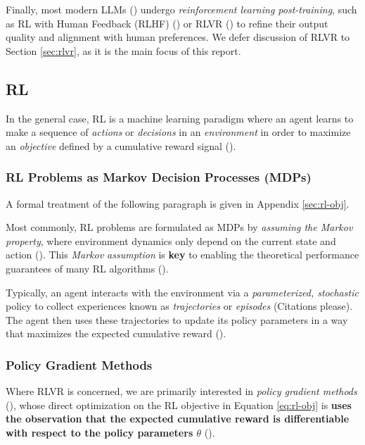 \documentclass{article} %
\theoremstyle{definition}
\begin{document}
Finally, most modern LLMs (\cite{tulu3, r1}) undergo \textit{reinforcement learning post-training},
such as RL with Human Feedback (RLHF) (\cite{Christiano-et-al-2017, InstructGPT-2022})
or RLVR (\cite{tulu3, grpo, r1}) to refine their output quality and alignment with human preferences.
We defer discussion of RLVR to Section \ref{sec:rlvr}, as it is the main focus of this report.

\subsection{RL}

In the general case, RL is a machine learning paradigm
where an agent learns to make a sequence of \textit{actions} or \textit{decisions} 
in an \textit{environment} in order to maximize an \textit{objective} defined by a cumulative reward signal (\cite{Sutton-and-Barto-1998}).

\subsubsection{RL Problems as Markov Decision Processes (MDPs)}
A formal treatment of the following paragraph is given in Appendix \ref{sec:rl-obj}.

Most commonly, RL problems are formulated as MDPs
by \textit{assuming the Markov property}, where environment dynamics
only depend on the current state and action
(\cite{SpinningUp-2018, Levine-et-al-2023, Sutton-and-Barto-1998}). This \textit{Markov assumption} is \textbf{key} to 
enabling the theoretical performance guarantees of many RL algorithms (\cite{Sutton-and-Barto-1998}).

Typically, an agent interacts with the environment via a \textit{parameterized, stochastic} policy
to collect experiences known as \textit{trajectories} or \textit{episodes} (Citations please).
The agent then uses these trajectories to update its policy parameters
in a way that maximizes the expected cumulative reward
(\cite{Sutton-and-Barto-1998, SpinningUp-2018, Levine-et-al-2023}).


\subsubsection{Policy Gradient Methods}
Where RLVR is concerned, we are primarily interested in \textit{policy gradient methods} (\cite{wk2, SpinningUp-2018, Weng-2018}),
whose direct optimization on the RL objective in Equation \eqref{eq:rl-obj} is \textbf{uses the
observation that the expected cumulative reward is differentiable with respect to the policy parameters $\theta$} (\cite{SpinningUp-2018,Levine-et-al-2023,Weng-2018}).
\end{document}
